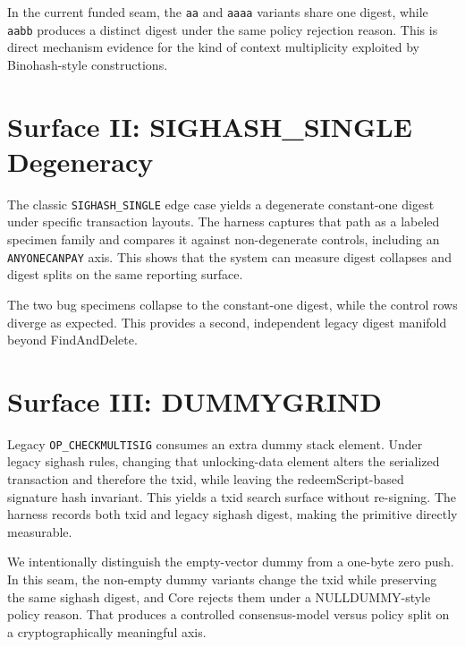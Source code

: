 \documentclass[11pt]{article}
\begin{document}
\begin{center}

\end{center}

In the current funded seam, the \texttt{aa} and \texttt{aaaa} variants share one digest, while \texttt{aabb} produces a distinct digest under the same policy rejection reason. This is direct mechanism evidence for the kind of context multiplicity exploited by Binohash-style constructions.

\section{Surface II: SIGHASH\_SINGLE Degeneracy}

The classic \texttt{SIGHASH\_SINGLE} edge case yields a degenerate constant-one digest under specific transaction layouts. The harness captures that path as a labeled specimen family and compares it against non-degenerate controls, including an \texttt{ANYONECANPAY} axis. This shows that the system can measure digest collapses and digest splits on the same reporting surface.

\begin{center}

\end{center}

The two bug specimens collapse to the constant-one digest, while the control rows diverge as expected. This provides a second, independent legacy digest manifold beyond FindAndDelete.

\section{Surface III: DUMMYGRIND}

Legacy \texttt{OP\_CHECKMULTISIG} consumes an extra dummy stack element. Under legacy sighash rules, changing that unlocking-data element alters the serialized transaction and therefore the txid, while leaving the redeemScript-based signature hash invariant. This yields a txid search surface without re-signing. The harness records both txid and legacy sighash digest, making the primitive directly measurable.

\begin{center}

\end{center}

We intentionally distinguish the empty-vector dummy from a one-byte zero push. In this seam, the non-empty dummy variants change the txid while preserving the same sighash digest, and Core rejects them under a NULLDUMMY-style policy reason. That produces a controlled consensus-model versus policy split on a cryptographically meaningful axis.
\end{document}
